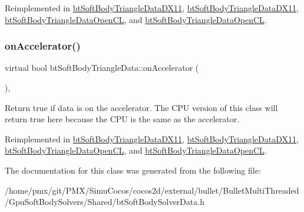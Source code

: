 Reimplemented in \hyperlink{classbtSoftBodyTriangleDataDX11_ae1dc56ae7688b61b271f2213296caf19}{bt\+Soft\+Body\+Triangle\+Data\+D\+X11}, \hyperlink{classbtSoftBodyTriangleDataDX11_a337ba5c2142ee9571a6cce7871a59a37}{bt\+Soft\+Body\+Triangle\+Data\+D\+X11}, \hyperlink{classbtSoftBodyTriangleDataOpenCL_ae6287090bdc3505f89d495ded41660e8}{bt\+Soft\+Body\+Triangle\+Data\+Open\+CL}, and \hyperlink{classbtSoftBodyTriangleDataOpenCL_a076bbaf97478a0756c25bf887e6bba1b}{bt\+Soft\+Body\+Triangle\+Data\+Open\+CL}.

\mbox{\label{classbtSoftBodyTriangleData_a7e461faee6801a25e4ccdf108d55ed54}} 
\subsubsection{\texorpdfstring{on\+Accelerator()}{onAccelerator()}\hspace{0.1cm}{\footnotesize\ttfamily [2/2]}}
{\footnotesize\ttfamily virtual bool bt\+Soft\+Body\+Triangle\+Data\+::on\+Accelerator (\begin{DoxyParamCaption}{ }\end{DoxyParamCaption})\hspace{0.3cm}{\ttfamily [inline]}, {\ttfamily [virtual]}}

Return true if data is on the accelerator. The C\+PU version of this class will return true here because the C\+PU is the same as the accelerator. 

Reimplemented in \hyperlink{classbtSoftBodyTriangleDataDX11_ae1dc56ae7688b61b271f2213296caf19}{bt\+Soft\+Body\+Triangle\+Data\+D\+X11}, \hyperlink{classbtSoftBodyTriangleDataDX11_a337ba5c2142ee9571a6cce7871a59a37}{bt\+Soft\+Body\+Triangle\+Data\+D\+X11}, \hyperlink{classbtSoftBodyTriangleDataOpenCL_ae6287090bdc3505f89d495ded41660e8}{bt\+Soft\+Body\+Triangle\+Data\+Open\+CL}, and \hyperlink{classbtSoftBodyTriangleDataOpenCL_a076bbaf97478a0756c25bf887e6bba1b}{bt\+Soft\+Body\+Triangle\+Data\+Open\+CL}.



The documentation for this class was generated from the following file\+:\begin{DoxyCompactItemize}
\item 
/home/pmx/git/\+P\+M\+X/\+Simu\+Cocos/cocos2d/external/bullet/\+Bullet\+Multi\+Threaded/\+Gpu\+Soft\+Body\+Solvers/\+Shared/bt\+Soft\+Body\+Solver\+Data.\+h\end{DoxyCompactItemize}
